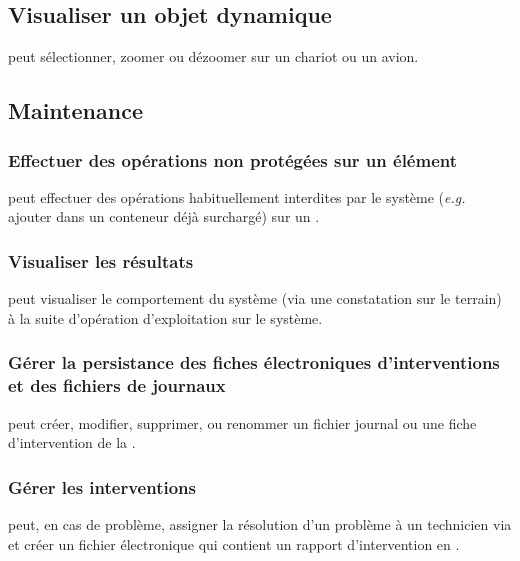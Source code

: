 \subsection{Visualiser un objet dynamique}
 peut sélectionner, zoomer ou dézoomer sur un chariot ou un avion.

\subsection{Maintenance}

\subsubsection{Effectuer des opérations non protégées sur un élément}
 peut effectuer des opérations habituellement interdites par le système (\textsl{e.g.} ajouter dans un conteneur déjà surchargé) sur un  .

\subsubsection{Visualiser les résultats}
 peut visualiser le comportement du système (via une constatation sur le terrain) à la suite d'opération d'exploitation sur le système.

\subsubsection{Gérer la persistance des fiches électroniques d'interventions et des fichiers de journaux}
 peut créer, modifier, supprimer, ou renommer un fichier journal ou une fiche d'intervention de la .

\subsubsection{Gérer les interventions}
 peut, en cas de problème, assigner la résolution d'un problème à un technicien via  et créer un fichier électronique qui contient un rapport d'intervention en .

